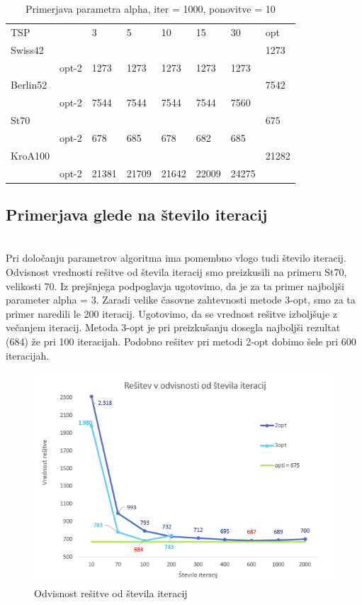 \documentclass[12pt,a4paper]{amsart}
\theoremstyle{definition} %
\theoremstyle{plain} %
\begin{document}
\begin{table}[H]
\caption{Primerjava parametra alpha, iter = 1000, ponovitve = 10}
\begin{tabular}{llllllll}
\rowcolor[HTML]{FFCCC9} 
TSP      &       & 3     & 5     & 10    & 15   & 30   & opt   \\
Swiss42 &       &       &       &       &      &      & 1273  \\
         & opt-2 & 1273  & 1273  & 1273  & 1273 & 1273 &       \\
Berlin52  &       &       &       &       &      &      & 7542  \\
         & opt-2 & 7544  & 7544  & 7544  & 7544 & 7560 &       \\
St70     &       &       &       &       &      &      & 675   \\
         & opt-2 & 678   & 685   & 678   & 682  & 685  &       \\
KroA100  &       &       &       &       &      &      & 21282 \\
         & opt-2 & 21381 & 21709 & 21642 &  22009    &  24275    &      
\end{tabular}
\end{table}

\subsection{Primerjava glede na število iteracij} ~\\

Pri določanju parametrov algoritma ima pomembno vlogo tudi število iteracij. Odvisnost vrednosti rešitve od števila iteracij smo preizkusili na primeru St70, velikosti 70. Iz prejšnjega podpoglavja ugotovimo, da je za ta primer najboljši parameter alpha = 3. Zaradi velike časovne zahtevnosti metode 3-opt, smo za ta primer naredili le 200 iteracij. Ugotovimo, da se vrednost rešitve izboljšuje z večanjem iteracij. Metoda 3-opt je pri preizkušanju dosegla najboljši rezultat (684) že pri 100 iteracijah. Podobno rešitev pri metodi 2-opt dobimo šele pri 600 iteracijah. 

\begin{figure}[H]
\caption{Odvisnost rešitve od števila iteracij}
\centering
\includegraphics[scale =0.8]{resitev_iteracije}
\end{figure}
\end{document}
